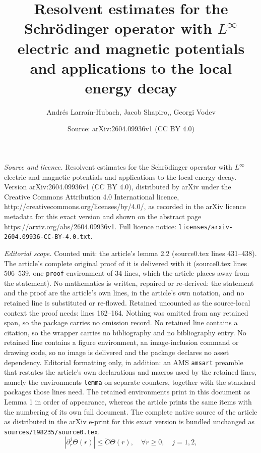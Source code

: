 \documentclass[10pt,a4paper]{amsart}
\title{Resolvent estimates for the Schr\"odinger operator with $L^\infty$ electric and magnetic potentials and applications to the local energy decay}
\author{Andr\'es Larra\'in-Hubach, Jacob Shapiro,, Georgi Vodev}
\date{Source: arXiv:2604.09936v1 (CC BY 4.0)}
\begin{document}
\maketitle

\noindent\emph{Source and licence.} Resolvent estimates for the Schr\"odinger operator with $L^\infty$ electric and magnetic potentials and applications to the local energy decay. Version arXiv:2604.09936v1 (CC BY 4.0), distributed by arXiv under the Creative Commons Attribution 4.0 International licence, http://creativecommons.org/licenses/by/4.0/, as recorded in the arXiv licence metadata for this exact version and shown on the abstract page https://arxiv.org/abs/2604.09936v1. Full licence notice: \texttt{licenses/arxiv-2604.09936-CC-BY-4.0.txt}.\par\smallskip

\noindent\textit{Editorial scope.} Counted unit: the article's lemma 2.2 (source0.tex lines 431--438). The article's complete original proof of it is delivered with it (source0.tex lines 506--539, one \texttt{proof} environment of 34 lines, which the article places away from the statement). No mathematics is written, repaired or re-derived: the statement and the proof are the article's own lines, in the article's own notation, and no retained line is substituted or re-flowed.  Retained uncounted as the source-local context the proof needs: lines 162--164.  Nothing was omitted from any retained span, so the package carries no omission record.  No retained line contains a citation, so the wrapper carries no bibliography and no bibliography entry.  No retained line contains a figure environment, an image-inclusion command or drawing code, so no image is delivered and the package declares no asset dependency.  Editorial formatting only, in addition: an AMS \texttt{amsart} preamble that restates the article's own declarations and macros used by the retained lines, namely the environments \texttt{lemma} on separate counters, together with the standard packages those lines need.  The retained environments print in this document as Lemma 1 in order of appearance, whereas the article prints the same items with the numbering of its own full document.  The complete native source of the article as distributed in the arXiv e-print for this exact version is bundled unchanged as \texttt{sources/198235/source0.tex}.
\begin{equation}\label{eq:1.7}
\left|\partial_r^j\Theta(r)\right|\le\widetilde C\Theta(r),\quad\forall r\ge 0,\quad j=1,2,
\end{equation}
\end{document}
